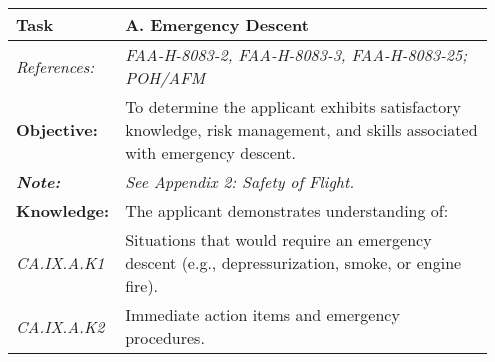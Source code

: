 \begin{table}[H]
\begin{tabular}%
  {>{\raggedleft\arraybackslash}p{0.15\linewidth}%
   >{\raggedright\arraybackslash}p{0.8\linewidth}%
  }
\textbf{Task}                                                       & \textbf{A. Emergency Descent}                                                                                                                                                                                                       \\ \hline
\textit{References:}                                                & \textit{FAA-H-8083-2, FAA-H-8083-3, FAA-H-8083-25; POH/AFM}                                                                                                                                                                         \\
\textbf{Objective:}                                                 & To determine the applicant exhibits satisfactory knowledge, risk management, and skills associated with emergency descent.                                                                                                          \\
\textit{\textbf{Note:}}                                             & \textit{See Appendix 2: Safety of Flight.}                                                                                                                                                                                          \\ \hline
\textbf{Knowledge:}                                                 & The applicant demonstrates understanding of:                                                                                                                                                                                        \\
\textit{CA.IX.A.K1}                                                 & Situations that would require an emergency descent (e.g., depressurization, smoke, or engine fire).                                                                                                                                 \\
\textit{CA.IX.A.K2}                                                 & Immediate action items and emergency procedures.                                                                                                                                                                                    \\

\end{tabular}
\end{table}
